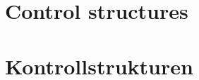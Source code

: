 
\maketitle
\clearpage
\tableofcontents
\clearpage

\ifen
\section{Control structures}
\fi
\ifde
\section{Kontrollstrukturen}
\fi

